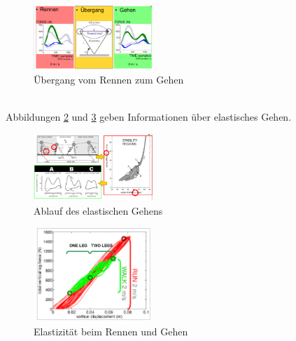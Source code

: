 \begin{figure}[h!]
	\centering
	\includegraphics[width=0.4\textwidth]{figures/ch06_uebergang2.png}
	\caption{Übergang vom Rennen zum Gehen}
	\label{uebergang}
\end{figure}\\
Abbildungen \ref{eg} und \ref{erg} geben Informationen über elastisches Gehen.
\begin{figure}[h!]
	\centering
	\includegraphics[width=0.4\textwidth]{figures/ch06_gehen.png}
	\caption{Ablauf des elastischen Gehens}
	\label{eg}
\end{figure}
\begin{figure}[h!]
	\centering
	\includegraphics[width=0.4\textwidth]{figures/ch06_rennen-gehen.png}
	\caption{Elastizität beim Rennen und Gehen}
	\label{erg}
\end{figure}


